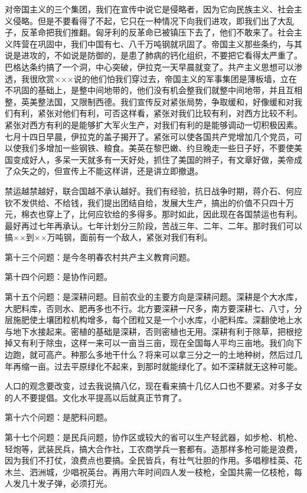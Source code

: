 对帝国主义的三个集团，我们在宣传中说它是侵略者，因为它向民族主义、社会主义侵略。但是不要看得了不起，它只在一种情况下向我们进攻，即我们出了大乱子，反革命把我们推翻。匈牙利的反革命已被镇压下去了，他们不敢来了。社会主义阵营在巩固中，我们中国有七、八千万吨钢就巩固了。帝国主义那些条约，与其说是进攻的，不如说是防御的，是患了肺病的钙化组织，不要把它看得太严重了。巴格达条约搞了一个洞，中心突破，伊拉克一天早晨就变了。共产主义思想可以渗透，我很欣赏×××说的他们怕我们穿过去，帝国主义的军事集团是薄板墙，立在不巩固的基础上，是整中间地带的，他们没有机会整我们就整中间地带，并且互相整，英美整法国，又限制西德。我们宣传反对紧张局势，争取缓和，好像缓和对我们有利，紧张对他们有利，可否这样看，紧张对我们比较有利，对西方比较不利。紧张对西方有利的是能够扩大军火生产，对我们有利的是能够调动一切积极因素。七月十四日早晨，伊拉克的盖子揭开了。紧张可以使各国共产党增加几个党员，可以使我们多增加一些钢铁、粮食。美英在黎巴嫩、约旦晚走一些日子好，不要使美国变成好人，多呆一天就多有一天好处，抓住了美国的辫子，有文章好做，美帝成了众矢之的，但宣传上不能这样讲，还是讲立即撤退。

禁运越禁越好，联合国越不承认越好。我们有经验，抗日战争时期，蒋介石、何应钦不发供给、不给钱，我们提出团结自给，发展大生产，搞出的价值不只四十万元，棉衣也穿上了，比何应钦给的多得多。那时如此，因此现在各国禁运也有利。最好再过七年再承认。七年计划分三阶段，苦战三年、二年、二年。那时我们可以搞××到××万吨钢，面前有一个敌人，紧张对我们有利。

第十三个问题：是今冬明春农村共产主义教育问题。

第十四个问题：是协作问题。

第十五个问题：是深耕问题。目前农业的主要方向是深耕问题。深耕是个大水库，大肥料库，否则水、肥再多也不行。北方要深耕一尺多，南方要深耕七、八寸，分层施肥使土壤团粒机构增多，每个团粒又是一个小水库，小肥料库。深翻使地上水与地下水接起来。密植的基础是深耕，否则密植也无用。深耕有利于除草，把根挖掉又有利于除虫，这样一来可以一亩当三亩，现在全国每人平均三亩地。我们向下边跑，就可高产。种那么多地干什么？将来可以拿三分之一的土地种树，然后过几年再缩一亩。过去平原绿化不起来，到那时就能绿化了。如不深耕就无这种可能。

人口的观念要改变，过去我说搞八亿，现在看来搞十几亿人口也不要紧。对多子女的人不要提倡。文化水平提高以后就真正节育了。

第十六个问题：是肥料问题。

第十七个问题：是民兵问题，协作区或较大的省可以生产轻武器，如步枪、机枪、轻炮等，武装民兵，搞大合作社，工农商学兵一套都有。造那样多枪可能是浪费，因为我们不打仗，浪费点也要搞。全民皆兵，有壮气壮胆的作用。多唱穆桂英、花木兰、泗洲城，少唱祝英台。再用六年时间四人发一枝枪，全国共需一亿枝枪，每人发几十发子弹，必须打光。


